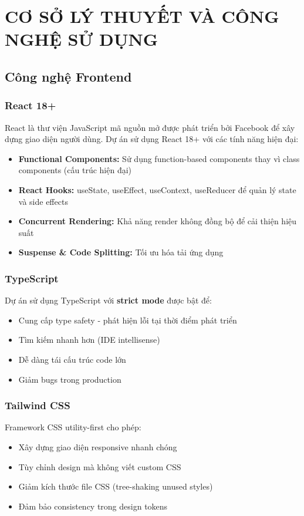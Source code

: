 \chapter{CƠ SỞ LÝ THUYẾT VÀ CÔNG NGHỆ SỬ DỤNG}

\section{Công nghệ Frontend}
\subsection{React 18+}
React là thư viện JavaScript mã nguồn mở được phát triển bởi Facebook để xây dựng giao diện người dùng. Dự án sử dụng React 18+ với các tính năng hiện đại:

\begin{itemize}
    \item \textbf{Functional Components:} Sử dụng function-based components thay vì class components (cấu trúc hiện đại)
    \item \textbf{React Hooks:} useState, useEffect, useContext, useReducer để quản lý state và side effects
    \item \textbf{Concurrent Rendering:} Khả năng render không đồng bộ để cải thiện hiệu suất
    \item \textbf{Suspense \& Code Splitting:} Tối ưu hóa tải ứng dụng
\end{itemize}

\subsection{TypeScript}
Dự án sử dụng TypeScript với \textbf{strict mode} được bật để:

\begin{itemize}
    \item Cung cấp type safety - phát hiện lỗi tại thời điểm phát triển
    \item Tìm kiếm nhanh hơn (IDE intellisense)
    \item Dễ dàng tái cấu trúc code lớn
    \item Giảm bugs trong production
\end{itemize}

\subsection{Tailwind CSS}
Framework CSS utility-first cho phép:

\begin{itemize}
    \item Xây dựng giao diện responsive nhanh chóng
    \item Tùy chỉnh design mà không viết custom CSS
    \item Giảm kích thước file CSS (tree-shaking unused styles)
    \item Đảm bảo consistency trong design tokens
\end{itemize}

